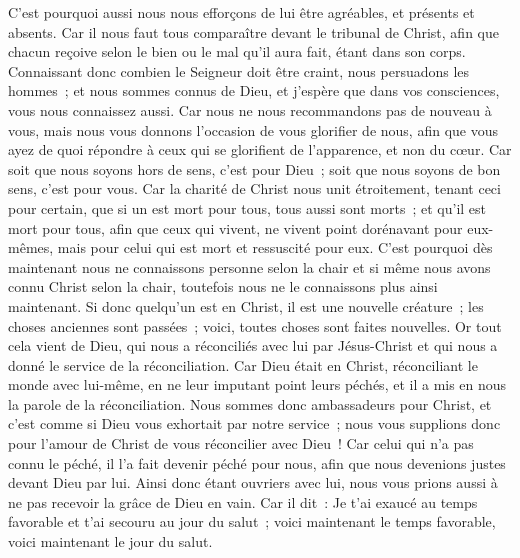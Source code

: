 \begin{multicols}{2}
C'est pourquoi aussi nous nous efforçons de lui être agréables, et présents et absents.
Car il nous faut tous comparaître devant le tribunal de Christ, afin que chacun reçoive selon le bien ou le mal qu'il aura fait, étant dans son corps.
Connaissant donc combien le Seigneur doit être craint, nous persuadons les hommes~; et nous sommes connus de Dieu, et j'espère que dans vos consciences, vous nous connaissez aussi.
Car nous ne nous recommandons pas de nouveau à vous, mais nous vous donnons l'occasion de vous glorifier de nous, afin que vous ayez de quoi répondre à ceux qui se glorifient de l'apparence, et non du cœur.
Car soit que nous soyons hors de sens, c'est pour Dieu~; soit que nous soyons de bon sens, c'est pour vous.
Car la charité de Christ nous unit étroitement, tenant ceci pour certain, que si un est mort pour tous, tous aussi sont morts~;
et qu'il est mort pour tous, afin que ceux qui vivent, ne vivent point dorénavant pour eux-mêmes, mais pour celui qui est mort et ressuscité pour eux.
C'est pourquoi dès maintenant nous ne connaissons personne selon la chair et si même nous avons connu Christ selon la chair, toutefois nous ne le connaissons plus ainsi maintenant.
Si donc quelqu'un est en Christ, il est une nouvelle créature~; les choses anciennes sont passées~; voici, toutes choses sont faites nouvelles.
Or tout cela vient de Dieu, qui nous a réconciliés avec lui par Jésus-Christ et qui nous a donné le service de la réconciliation.
Car Dieu était en Christ, réconciliant le monde avec lui-même, en ne leur imputant point leurs péchés, et il a mis en nous la parole de la réconciliation.
Nous sommes donc ambassadeurs pour Christ, et c'est comme si Dieu vous exhortait par notre service~; nous vous supplions donc pour l'amour de Christ de vous réconcilier avec Dieu~!
Car celui qui n'a pas connu le péché, il l'a fait devenir péché pour nous, afin que nous devenions justes devant Dieu par lui.
\VerseOne{}Ainsi donc étant ouvriers avec lui, nous vous prions aussi à ne pas recevoir la grâce de Dieu en vain.
Car il dit~: Je t'ai exaucé au temps favorable et t'ai secouru au jour du salut~; voici maintenant le temps favorable, voici maintenant le jour du salut.

\end{multicols}
